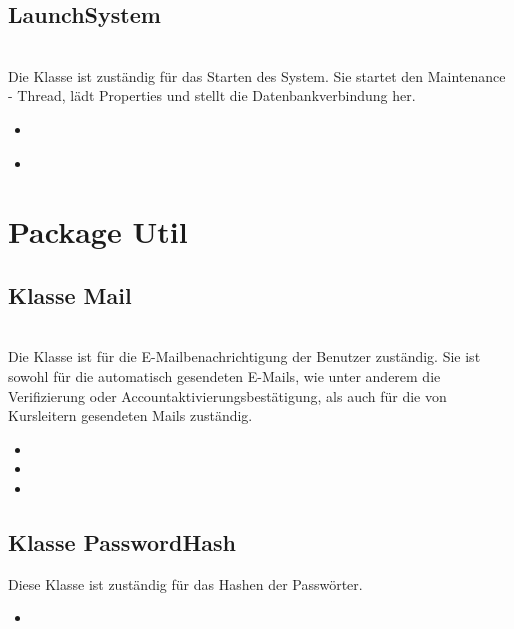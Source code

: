 \documentclass[a4paper]{scrreprt}
\begin{document}
		\subsection{LaunchSystem}
		\\
		Die Klasse ist zuständig für das Starten des System. Sie startet den Maintenance - Thread, lädt Properties und stellt die Datenbankverbindung her.
		\begin{itemize}
			\item {}\\
			\item {}\\
		\end{itemize}
		
		
		
	\section{Package Util}
	
	\subsection{Klasse Mail}
	\\
	Die Klasse ist für die E-Mailbenachrichtigung der Benutzer zuständig. Sie ist sowohl für die automatisch gesendeten E-Mails, wie unter anderem die Verifizierung oder Accountaktivierungsbestätigung, als auch für die von Kursleitern gesendeten Mails zuständig.
	\begin{itemize}
		\item {}
		\item {}
		\item {}
	\end{itemize}
	
	\subsection{Klasse PasswordHash}
	Diese Klasse ist zuständig für das Hashen der Passwörter.
	\begin{itemize}
		\item {}
	\end{itemize}
	
\end{document}
